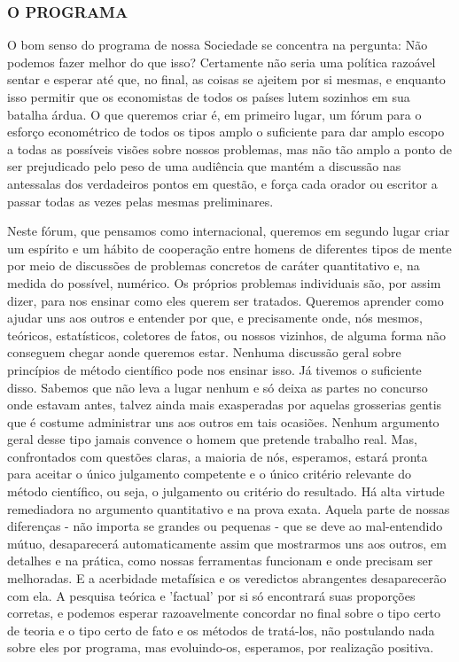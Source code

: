 \documentclass[12pt]{article}
\begin{document}
\subsubsection{\textbf{O PROGRAMA}}
O bom senso do programa de nossa Sociedade se concentra na pergunta: Não podemos fazer melhor do que isso? Certamente não seria uma política razoável sentar e esperar até que, no final, as coisas se ajeitem por si mesmas, e enquanto isso permitir que os economistas de todos os países lutem sozinhos em sua batalha árdua. O que queremos criar é, em primeiro lugar, um fórum para o esforço econométrico de todos os tipos amplo o suficiente para dar amplo escopo a todas as possíveis visões sobre nossos problemas, mas não tão amplo a ponto de ser prejudicado pelo peso de uma audiência que mantém a discussão nas antessalas dos verdadeiros pontos em questão, e força cada orador ou escritor a passar todas as vezes pelas mesmas preliminares.

Neste fórum, que pensamos como internacional, queremos em segundo lugar criar um espírito e um hábito de cooperação entre homens de diferentes tipos de mente por meio de discussões de problemas concretos de caráter quantitativo e, na medida do possível, numérico. Os próprios problemas individuais são, por assim dizer, para nos ensinar como eles querem ser tratados. Queremos aprender como ajudar uns aos outros e entender por que, e precisamente onde, nós mesmos, teóricos, estatísticos, coletores de fatos, ou nossos vizinhos, de alguma forma não conseguem chegar aonde queremos estar. Nenhuma discussão geral sobre princípios de método científico pode nos ensinar isso. Já tivemos o suficiente disso. Sabemos que não leva a lugar nenhum e só deixa as partes no concurso onde estavam antes, talvez ainda mais exasperadas por aquelas grosserias gentis que é costume administrar uns aos outros em tais ocasiões. Nenhum argumento geral desse tipo jamais convence o homem que pretende trabalho real. Mas, confrontados com questões claras, a maioria de nós, esperamos, estará pronta para aceitar o único julgamento competente e o único critério relevante do método científico, ou seja, o julgamento ou critério do resultado. Há alta virtude remediadora no argumento quantitativo e na prova exata. Aquela parte de nossas diferenças - não importa se grandes ou pequenas - que se deve ao mal-entendido mútuo, desaparecerá automaticamente assim que mostrarmos uns aos outros, em detalhes e na prática, como nossas ferramentas funcionam e onde precisam ser melhoradas. E a acerbidade metafísica e os veredictos abrangentes desaparecerão com ela. A pesquisa teórica e 'factual' por si só encontrará suas proporções corretas, e podemos esperar razoavelmente concordar no final sobre o tipo certo de teoria e o tipo certo de fato e os métodos de tratá-los, não postulando nada sobre eles por programa, mas evoluindo-os, esperamos, por realização positiva.
\end{document}
